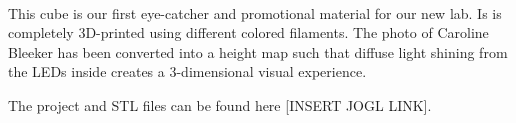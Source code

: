 \documentclass{report}
\begin{document}
\clearpage
\begin{figure}
    \centering
\end{figure}
\clearpage

 \\

This cube is our first eye-catcher and promotional material for our new lab. Is is completely 3D-printed using different colored filaments. The photo of Caroline Bleeker has been converted into a height map such that diffuse light shining from the LEDs inside creates a 3-dimensional visual experience. 

The project and STL files can be found here [INSERT JOGL LINK].

\clearpage
\begin{figure}
    \centering
\end{figure}
\clearpage
\end{document}
